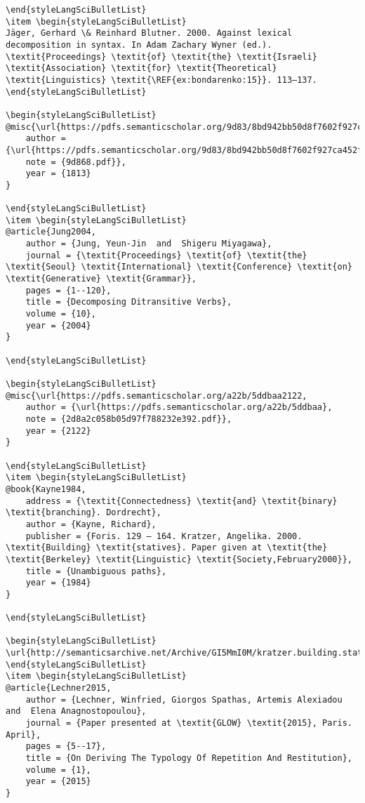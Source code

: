 \documentclass[output=paper,modfonts,nonflat,
 hidelinks
]{langsci/langscibook}
\begin{document}
\begin{verbatim}
\end{styleLangSciBulletList}
\item \begin{styleLangSciBulletList}
Jäger, Gerhard \& Reinhard Blutner. 2000. Against lexical decomposition in syntax. In Adam Zachary Wyner (ed.). \textit{Proceedings} \textit{of} \textit{the} \textit{Israeli} \textit{Association} \textit{for} \textit{Theoretical} \textit{Linguistics} \textit{\REF{ex:bondarenko:15}}. 113–137.
\end{styleLangSciBulletList}

\begin{styleLangSciBulletList}
@misc{\url{https://pdfs.semanticscholar.org/9d83/8bd942bb50d8f7602f927ca452f1813,
	author = {\url{https://pdfs.semanticscholar.org/9d83/8bd942bb50d8f7602f927ca452f},
	note = {9d868.pdf}},
	year = {1813}
}

\end{styleLangSciBulletList}
\item \begin{styleLangSciBulletList}
@article{Jung2004,
	author = {Jung, Yeun-Jin  and  Shigeru Miyagawa},
	journal = {\textit{Proceedings} \textit{of} \textit{the} \textit{Seoul} \textit{International} \textit{Conference} \textit{on} \textit{Generative} \textit{Grammar}},
	pages = {1--120},
	title = {Decomposing Ditransitive Verbs},
	volume = {10},
	year = {2004}
}

\end{styleLangSciBulletList}

\begin{styleLangSciBulletList}
@misc{\url{https://pdfs.semanticscholar.org/a22b/5ddbaa2122,
	author = {\url{https://pdfs.semanticscholar.org/a22b/5ddbaa},
	note = {2d8a2c058b05d97f788232e392.pdf}},
	year = {2122}
}

\end{styleLangSciBulletList}
\item \begin{styleLangSciBulletList}
@book{Kayne1984,
	address = {\textit{Connectedness} \textit{and} \textit{binary} \textit{branching}. Dordrecht},
	author = {Kayne, Richard},
	publisher = {Foris. 129 – 164. Kratzer, Angelika. 2000. \textit{Building} \textit{statives}. Paper given at \textit{the} \textit{Berkeley} \textit{Linguistic} \textit{Society,February2000}},
	title = {Unambiguous paths},
	year = {1984}
}

\end{styleLangSciBulletList}

\begin{styleLangSciBulletList}
\url{http://semanticsarchive.net/Archive/GI5MmI0M/kratzer.building.statives.pdf}
\end{styleLangSciBulletList}
\item \begin{styleLangSciBulletList}
@article{Lechner2015,
	author = {Lechner, Winfried, Giorgos Spathas, Artemis Alexiadou  and  Elena Anagnostopoulou},
	journal = {Paper presented at \textit{GLOW} \textit{2015}, Paris. April},
	pages = {5--17},
	title = {On Deriving The Typology Of Repetition And Restitution},
	volume = {1},
	year = {2015}
}


\end{verbatim}
\end{document}
